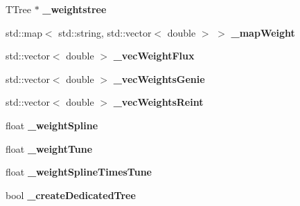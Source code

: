 \begin{DoxyCompactItemize}
\item 
T\+Tree $\ast$ {\bfseries \+\_\+weightstree}\hypertarget{classanalysis_1_1EventWeightTree_a007ac1f04819cff64bb54b6206966408}{}\label{classanalysis_1_1EventWeightTree_a007ac1f04819cff64bb54b6206966408}

\item 
std\+::map$<$ std\+::string, std\+::vector$<$ double $>$ $>$ {\bfseries \+\_\+map\+Weight}\hypertarget{classanalysis_1_1EventWeightTree_aef493db93e72288ef19cd155052fbce6}{}\label{classanalysis_1_1EventWeightTree_aef493db93e72288ef19cd155052fbce6}

\item 
std\+::vector$<$ double $>$ {\bfseries \+\_\+vec\+Weight\+Flux}\hypertarget{classanalysis_1_1EventWeightTree_a63fcb54ac96617bfa03f1c98bc941d47}{}\label{classanalysis_1_1EventWeightTree_a63fcb54ac96617bfa03f1c98bc941d47}

\item 
std\+::vector$<$ double $>$ {\bfseries \+\_\+vec\+Weights\+Genie}\hypertarget{classanalysis_1_1EventWeightTree_a27f4bcfa903da58796010d056b257f1c}{}\label{classanalysis_1_1EventWeightTree_a27f4bcfa903da58796010d056b257f1c}

\item 
std\+::vector$<$ double $>$ {\bfseries \+\_\+vec\+Weights\+Reint}\hypertarget{classanalysis_1_1EventWeightTree_a2afa517c5d3c82f395cca60f6bed1e55}{}\label{classanalysis_1_1EventWeightTree_a2afa517c5d3c82f395cca60f6bed1e55}

\item 
float {\bfseries \+\_\+weight\+Spline}\hypertarget{classanalysis_1_1EventWeightTree_a5f616b70e5653cd00a2beda1da0db13f}{}\label{classanalysis_1_1EventWeightTree_a5f616b70e5653cd00a2beda1da0db13f}

\item 
float {\bfseries \+\_\+weight\+Tune}\hypertarget{classanalysis_1_1EventWeightTree_aea3750979c4b1ccbf1c11973c79c6e6f}{}\label{classanalysis_1_1EventWeightTree_aea3750979c4b1ccbf1c11973c79c6e6f}

\item 
float {\bfseries \+\_\+weight\+Spline\+Times\+Tune}\hypertarget{classanalysis_1_1EventWeightTree_af732856a3e62e16d74369f7727adb471}{}\label{classanalysis_1_1EventWeightTree_af732856a3e62e16d74369f7727adb471}

\item 
bool {\bfseries \+\_\+create\+Dedicated\+Tree}\hypertarget{classanalysis_1_1EventWeightTree_a2ae36b271ba94dcdfcaafd0d3d9f4550}{}\label{classanalysis_1_1EventWeightTree_a2ae36b271ba94dcdfcaafd0d3d9f4550}


\end{DoxyCompactItemize}
